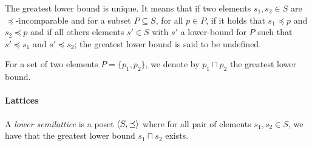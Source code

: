 \documentclass[letterpaper]{article}
\DeclarePairedDelimiter{\tuple}{\langle}{\rangle}
\theoremstyle{definition}
\begin{document}
The greatest lower bound is unique. It means that if two elements
$s_1, s_2 \in S$ are $\preceq$-incomparable and for a subset $P \subseteq S$,
for all $p \in P$, if it holds that $s_1 \preceq p$ and $s_2 \preceq p$
and if all others elements $s' \in S$ with $s'$ a lower-bound
for $P$ such that $s' \preceq s_1$ and $s' \preceq s_2$;
the greatest lower bound is said to be undefined.

For a set of two elements
$P = \{p_1, p_2\}$, we denote by $p_1 \sqcap p_2$ the greatest lower bound.

\paragraph{Lattices} A \textit{lower semilattice} is a poset
$\tuple{S, \preceq}$ where for all pair of elements $s_1, s_2 \in S$,
we have that the greatest lower bound $s_1 \sqcap s_2$ exists.


\end{document}
